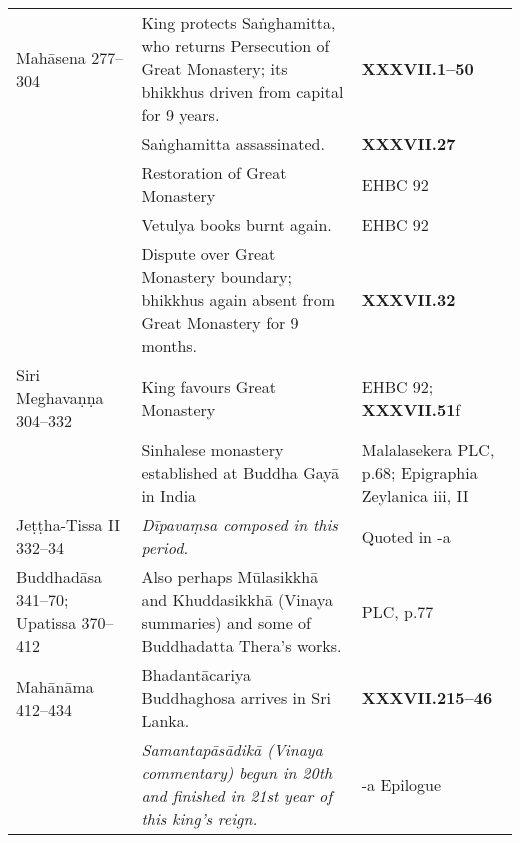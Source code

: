 \begin{tabular}{l|l|l}
    Mahāsena 277–304 & King protects Saṅghamitta, who returns Persecution of Great Monastery; its  bhikkhus driven from capital for 9 years.  & \textbf{\cite{Mhv} XXXVII.1–50}\\
     & Saṅghamitta assassinated. & \textbf{\cite{Mhv} XXXVII.27}\\
     &  Restoration of Great Monastery  & EHBC 92\\
     & Vetulya books burnt again.  & EHBC 92\\
     & Dispute over Great Monastery boundary; bhikkhus again absent from Great Monastery for 9 months. & \textbf{\cite{Mhv} XXXVII.32}\\
    Siri Meghavaṇṇa 304–332   & King favours Great Monastery & EHBC 92; \textbf{\cite{Mhv} XXXVII.51}f  \\
     & Sinhalese monastery established at Buddha Gayā in India & Malalasekera PLC, p.68; Epigraphia Zeylanica iii, II\\
    Jeṭṭha-Tissa II 332–34 & \emph{Dīpavaṃsa composed in this period.} & Quoted in \textbf{\cite{Vin}}-a\\
    Buddhadāsa 341–70; Upatissa  370–412   & Also perhaps Mūlasikkhā and Khuddasikkhā (Vinaya summaries) and some of Buddhadatta Thera’s works. & PLC, p.77\\
    Mahānāma 412–434 & Bhadantācariya Buddhaghosa arrives in Sri Lanka.   & \textbf{\cite{Mhv} XXXVII.215–46} \\
     & \emph{Samantapāsādikā (Vinaya commentary) begun in 20th and finished in 21st year of this king’s reign.} & \textbf{\cite{Vin}}-a Epilogue
\end{tabular}
\else
